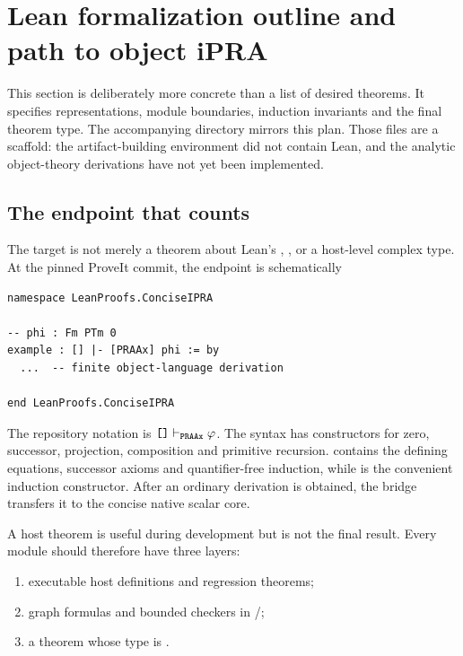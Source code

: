 \section{Lean formalization outline and path to object iPRA}\label{sec:formalization}

This section is deliberately more concrete than a list of desired theorems.  It
specifies representations, module boundaries, induction invariants and the
final theorem type.  The accompanying  directory mirrors this
plan.  Those files are a scaffold: the artifact-building environment did not
contain Lean, and the analytic object-theory derivations have not yet been
implemented.

\subsection{The endpoint that counts}

The target is not merely a theorem about Lean's , , or a
host-level complex type.  At the pinned ProveIt commit, the endpoint is
schematically
\begin{lstlisting}[language={}]
namespace LeanProofs.ConciseIPRA

-- phi : Fm PTm 0
example : [] |- [PRAAx] phi := by
  ...  -- finite object-language derivation

end LeanProofs.ConciseIPRA
\end{lstlisting}
The repository notation is \(\texttt{[]}\vdash_{\texttt{PRAAx}}\varphi\).  The syntax
 has constructors for zero, successor, projection, composition and
primitive recursion.   contains the defining equations, successor
axioms and quantifier-free induction, while  is the convenient
induction constructor.  After an ordinary derivation is obtained, the
 bridge transfers it to the concise native scalar core.

A host theorem is useful during development but is not the final result.  Every
module should therefore have three layers:

\begin{enumerate}
\item executable host definitions and regression theorems;
\item graph formulas and bounded checkers in /;
\item a theorem whose type is .
\end{enumerate}

